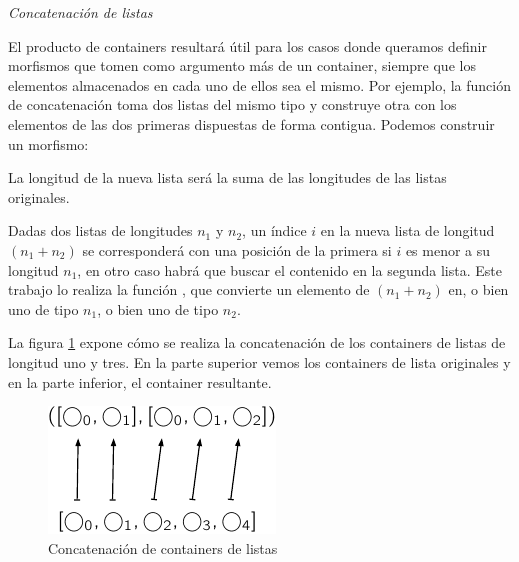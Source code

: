 \begin{example}{\it Concatenación de listas}\label{example:append}

  El producto de containers resultará útil para los casos donde queramos definir morfismos que tomen como argumento más de un container, siempre que los elementos almacenados en cada uno de ellos sea el mismo. Por ejemplo, la función de concatenación toma dos listas del mismo tipo y construye otra con los elementos de las dos primeras dispuestas de forma contigua. Podemos construir un morfismo:


  La longitud de la nueva lista será la suma de las longitudes de las listas originales. 


  Dadas dos listas de longitudes $n_1$ y $n_2$, un índice $i$ en la nueva lista de longitud $(n_1 + n_2)$ se corresponderá con una posición de la primera si $i$ es menor a su longitud $n_1$, en otro caso habrá que buscar el contenido en la segunda lista. Este trabajo lo realiza la función , que convierte un elemento de  $(n_1 + n_2)$ en, o bien uno de tipo  $n_1$, o bien uno de tipo  $n_2$.


  La figura \ref{fig:append} expone cómo se realiza la concatenación de los containers de listas de longitud uno y tres. En la parte superior vemos los containers de lista originales y en la parte inferior, el container resultante. 

\begin{figure}[H]
    \begin{center}
  \includegraphics{img/append.pdf}
    \end{center}
    \label{fig:append}
    \caption{Concatenación de containers de listas}
\end{figure}


\end{example}
